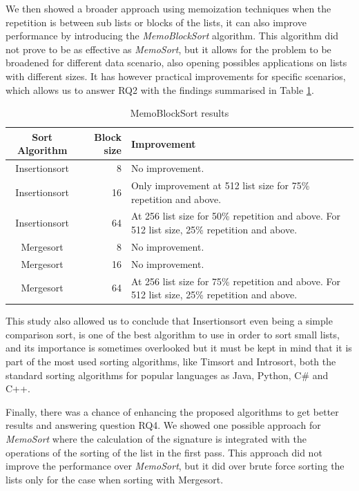 \documentclass[a4paper,12pt]{article}
\begin{document}
We then showed a broader approach using memoization techniques when the repetition is between sub lists or blocks of the lists, it can also improve performance by introducing the {\it MemoBlockSort} algorithm. This algorithm did not prove to be as effective as {\it MemoSort}, but it allows for the problem to be broadened for different data scenario, also opening possibles applications on lists with different sizes.  It has however practical improvements for specific scenarios, which allows us to answer RQ2 with the findings summarised in Table \ref{fig:MemoBlockSortResults}.

\begin{table}[H]
\centering
\begin{tabular}{|c|r|p{80mm}|}  \hline
	{Sort Algorithm} & {Block size} & {Improvement} \\  \hline
	Insertionsort & 8 & No improvement. \\ 
	Insertionsort & 16 & Only improvement at 512 list size for 75\% repetition and above. \\ 
	Insertionsort & 64 & At  256 list size for 50\% repetition and above. For 512 list size, 25\% repetition and above.\\ 
	Mergesort & 8 &  No improvement. \\ 
	Mergesort & 16 & No improvement. \\ 
	Mergesort & 64 & At  256 list size for 75\% repetition and above. For 512 list size, 25\% repetition and above. \\  \hline
\end{tabular}
\caption{MemoBlockSort results}
\label{fig:MemoBlockSortResults}
\end{table}

This study also allowed us to conclude that Insertionsort even being a simple comparison sort, is one of the best algorithm to use in order to sort small lists, and its importance is sometimes overlooked but it must be kept in mind that it is part of the most used sorting algorithms, like Timsort and Introsort, both the standard sorting algorithms for popular languages as Java, Python, C\# and C++.

Finally, there was a chance of enhancing the proposed algorithms to get better results and answering question RQ4. We showed one possible approach for  {\it MemoSort} where the calculation of the signature is integrated with the operations of the sorting of the list in the first pass. This approach did not improve the performance over {\it MemoSort}, but it did over brute force sorting the lists only for the case when sorting with Mergesort. \\
\end{document}
